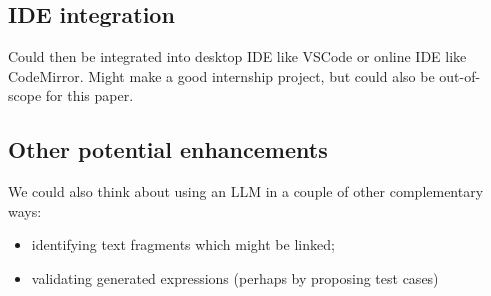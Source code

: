 \subsection{IDE integration}\label{subsec:ide-integration}

Could then be integrated into desktop IDE like VSCode or online IDE like CodeMirror. Might make a good
internship project, but could also be out-of-scope for this paper.

\subsection{Other potential enhancements}\label{subsec:other-potential-enhancements}

We could also think about using an LLM in a couple of other complementary ways:
\begin{itemize}
\item identifying text fragments which might be linked;
\item validating generated expressions (perhaps by proposing test cases)
\end{itemize}



